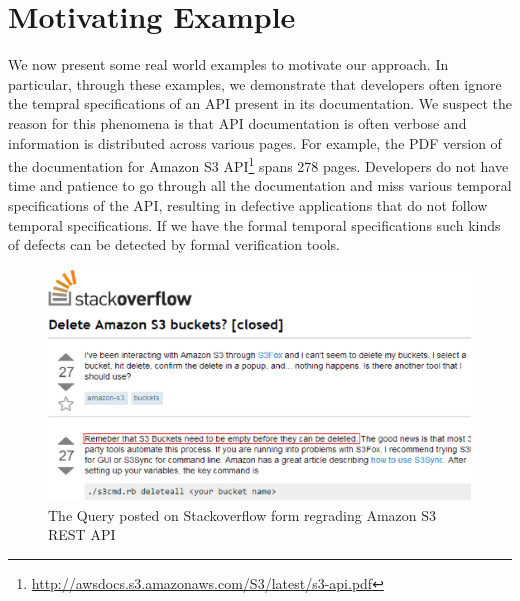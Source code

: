 \section{Motivating Example}
\label{sec:example}

We now present some real world examples to motivate our approach. In particular, through these examples, we demonstrate that developers often ignore the tempral specifications of an API present in its documentation. We suspect the reason for this phenomena is that API documentation is often verbose and information is distributed across various
pages. For example, the PDF version of the documentation for Amazon S3 API\footnote{\url{http://awsdocs.s3.amazonaws.com/S3/latest/s3-api.pdf}} spans 278 pages. Developers do not have time and patience to go through all the documentation and miss various temporal specifications of the API, resulting in defective applications that do not follow temporal specifications. 
If we have the formal temporal specifications such kinds of defects can be detected by formal verification tools.

\begin{figure}[t]
\begin{center}
\includegraphics[scale=0.4]{Stackoverflow.eps}
\end{center}
\caption{\label{fig:Stackoverflow} The Query posted on Stackoverflow form regrading Amazon S3 REST API}
\end{figure}

